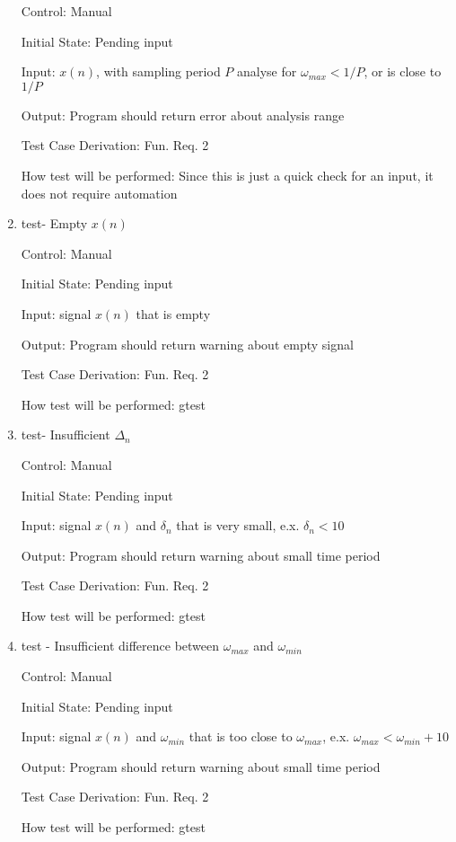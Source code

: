 \documentclass[12pt, titlepage]{article}
\begin{document}
\begin{enumerate}
Control: Manual
					
Initial State: Pending input
					
Input:  $x(n)$, with sampling period $P$ analyse for $\omega_{max} < 1/P$, or is close to $1/P$
					
Output: Program should return error about analysis range

Test Case Derivation: Fun. Req. 2

How test will be performed: Since this is just a quick check for an input, it does not require automation 

\item{test- Empty $x(n)$\\}

Control: Manual
					
Initial State: Pending input
					
Input: signal $x(n)$ that is empty
					
Output: Program should return warning about empty signal

Test Case Derivation: Fun. Req. 2

How test will be performed: gtest

\item{test- Insufficient $\Delta_n$\\}

Control: Manual
					
Initial State: Pending input
					
Input: signal $x(n)$ and $\delta_n$ that is very small, e.x. $\delta_n < 10$
					
Output: Program should return warning about small time period

Test Case Derivation: Fun. Req. 2

How test will be performed: gtest

\item{test - Insufficient difference between $\omega_{max}$ and $\omega_{min}$  \\}

Control: Manual
					
Initial State: Pending input
					
Input: signal $x(n)$ and $\omega_{min}$ that is too close to $\omega_{max}$, e.x. $\omega_{max} < \omega_{min} + 10 $
					
Output: Program should return warning about small time period

Test Case Derivation: Fun. Req. 2

How test will be performed: gtest
					

\end{enumerate}
\end{document}

